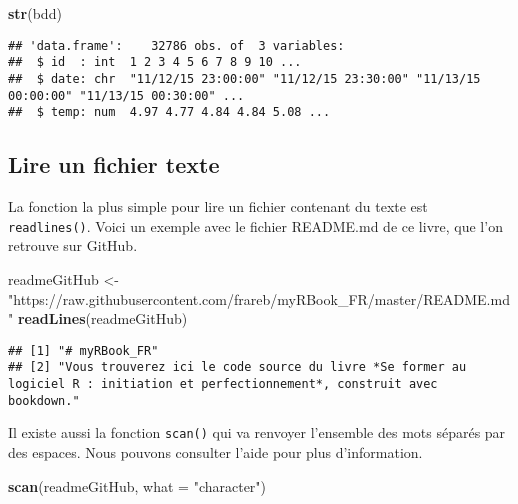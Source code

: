 \documentclass[]{book}
\newenvironment{Shaded}{\begin{snugshade}}{\end{snugshade}}
\newcommand{\KeywordTok}[1]{\textcolor[rgb]{0.13,0.29,0.53}{\textbf{#1}}}
\newcommand{\DataTypeTok}[1]{\textcolor[rgb]{0.13,0.29,0.53}{#1}}
\newcommand{\StringTok}[1]{\textcolor[rgb]{0.31,0.60,0.02}{#1}}
\newcommand{\NormalTok}[1]{#1}
\theoremstyle{definition}
\theoremstyle{definition}
\theoremstyle{definition}
\theoremstyle{remark}
\begin{document}
\begin{Shaded}
\begin{Highlighting}[]
\KeywordTok{str}\NormalTok{(bdd)}
\end{Highlighting}
\end{Shaded}

\begin{verbatim}
## 'data.frame':    32786 obs. of  3 variables:
##  $ id  : int  1 2 3 4 5 6 7 8 9 10 ...
##  $ date: chr  "11/12/15 23:00:00" "11/12/15 23:30:00" "11/13/15 00:00:00" "11/13/15 00:30:00" ...
##  $ temp: num  4.97 4.77 4.84 4.84 5.08 ...
\end{verbatim}

\subsection{Lire un fichier texte}\label{l016readTXT}

La fonction la plus simple pour lire un fichier contenant du texte est
\texttt{readlines()}. Voici un exemple avec le fichier README.md de ce
livre, que l'on retrouve sur GitHub.

\begin{Shaded}
\begin{Highlighting}[]
\NormalTok{readmeGitHub <-}\StringTok{ "https://raw.githubusercontent.com/frareb/myRBook_FR/master/README.md"}
\KeywordTok{readLines}\NormalTok{(readmeGitHub)}
\end{Highlighting}
\end{Shaded}

\begin{verbatim}
## [1] "# myRBook_FR"                                                                                                                   
## [2] "Vous trouverez ici le code source du livre *Se former au logiciel R : initiation et perfectionnement*, construit avec bookdown."
\end{verbatim}

Il existe aussi la fonction \texttt{scan()} qui va renvoyer l'ensemble
des mots séparés par des espaces. Nous pouvons consulter l'aide pour
plus d'information.

\begin{Shaded}
\begin{Highlighting}[]
\KeywordTok{scan}\NormalTok{(readmeGitHub, }\DataTypeTok{what =} \StringTok{"character"}\NormalTok{)}
\end{Highlighting}
\end{Shaded}
\end{document}
